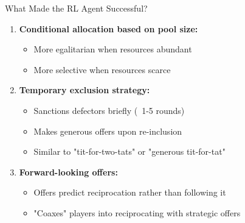 \documentclass[aspectratio=169]{beamer} %
\begin{document}
\begin{frame}{What Made the RL Agent Successful?}
\begin{enumerate}
    \item \textbf{Conditional allocation based on pool size:}
    \begin{itemize}
        \item More egalitarian when resources abundant
        \item More selective when resources scarce
    \end{itemize}
    
    \item \textbf{Temporary exclusion strategy:}
    \begin{itemize}
        \item Sanctions defectors briefly (~1-5 rounds)
        \item Makes generous offers upon re-inclusion
        \item Similar to "tit-for-two-tats" or "generous tit-for-tat"
    \end{itemize}
    
    \item \textbf{Forward-looking offers:}
    \begin{itemize}
        \item Offers predict reciprocation rather than following it
        \item "Coaxes" players into reciprocating with strategic offers
    \end{itemize}
\end{enumerate}
\end{frame}
\end{document}
